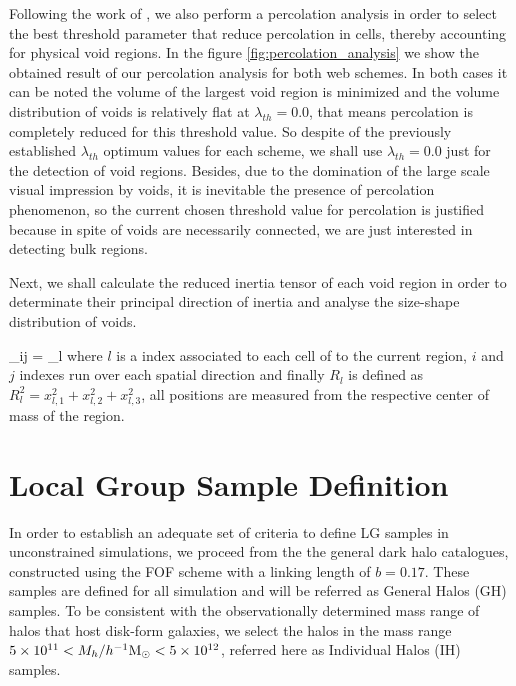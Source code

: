 \documentclass[usenatbib]{latex/mn2e}
\begin{document}
Following the work of , we also perform a 
percolation analysis in order to select the best threshold parameter that
reduce percolation in cells, thereby accounting for physical void regions.
In the figure \ref{fig:percolation_analysis} we show the obtained result 
of our percolation analysis for both web schemes. In both cases it can be 
noted the volume of the largest void region is minimized and the volume 
distribution of voids is relatively flat at $\lambda_{th} = 0.0$, that 
means percolation is completely reduced for this threshold value. So 
despite of the previously established $\lambda_{th}$ optimum values for 
each scheme, we shall use $\lambda_{th} = 0.0$ just for the detection of 
void regions. Besides, due to the domination of the large scale visual 
impression by voids, it is inevitable the presence of percolation 
phenomenon, so the current chosen threshold value for percolation is 
justified because in spite of voids are necessarily connected, we are just 
interested in detecting bulk regions.



Next, we shall calculate the reduced inertia tensor of each void region 
in order to determinate their principal direction of inertia and analyse 
the size-shape distribution of voids.


{ \tau_{ij} = \sum_l  }
where $l$ is a index associated to each cell of to the current region, 
$i$ and $j$ indexes run over each spatial direction and finally 
$R_l$ is defined as $R_l^2 = x_{l,1}^2 + x_{l,2}^2 + x_{l,3}^2$, all 
positions are measured from the respective center of mass of the region.




\section{Local Group Sample Definition}
\label{section:Def_Samples}



In order to establish an adequate set of criteria to define LG samples in 
unconstrained simulations, we proceed from the the general dark halo 
catalogues, constructed using the FOF scheme with a linking length of 
$b=0.17$. These samples are defined for all simulation and will be 
referred as General Halos (GH) samples. To be consistent with the 
observationally determined mass range of halos that host disk-form 
galaxies, we select the halos in the mass range $5\times10^{11} <
M_{h}/\hMsun < 5\times 10^{12}$, referred here as Individual Halos (IH) 
samples. 
\end{document}
